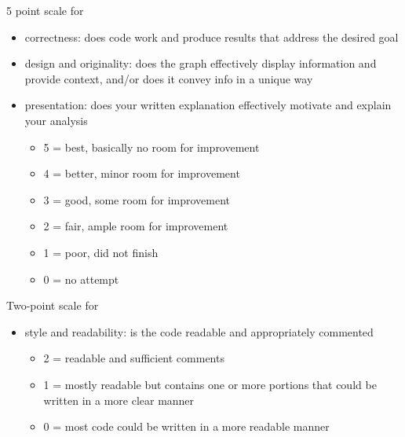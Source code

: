 \documentclass[
]{article}
\providecommand{\tightlist}{%
  \setlength{\itemsep}{0pt}\setlength{\parskip}{0pt}}
\begin{document}
5 point scale for

\begin{itemize}
\tightlist
\item
  correctness: does code work and produce results that address the
  desired goal
\item
  design and originality: does the graph effectively display information
  and provide context, and/or does it convey info in a unique way
\item
  presentation: does your written explanation effectively motivate and
  explain your analysis

  \begin{itemize}
  \tightlist
  \item
    5 = best, basically no room for improvement
  \item
    4 = better, minor room for improvement
  \item
    3 = good, some room for improvement
  \item
    2 = fair, ample room for improvement
  \item
    1 = poor, did not finish
  \item
    0 = no attempt
  \end{itemize}
\end{itemize}

Two-point scale for

\begin{itemize}
\tightlist
\item
  style and readability: is the code readable and appropriately
  commented

  \begin{itemize}
  \tightlist
  \item
    2 = readable and sufficient comments
  \item
    1 = mostly readable but contains one or more portions that could be
    written in a more clear manner
  \item
    0 = most code could be written in a more readable manner
  \end{itemize}
\end{itemize}
\end{document}
